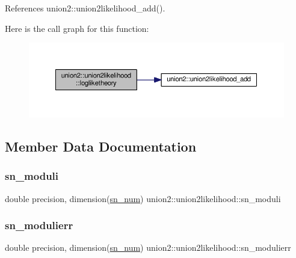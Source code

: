 References union2\+::union2likelihood\+\_\+add().

Here is the call graph for this function\+:
\nopagebreak
\begin{figure}[H]
\begin{center}
\leavevmode
\includegraphics[width=350pt]{structunion2_1_1union2likelihood_aa1eacea20f0e7bf3c7240826272ca6d4_cgraph}
\end{center}
\end{figure}


\subsection{Member Data Documentation}
\mbox{\label{structunion2_1_1union2likelihood_a55465c072a132baa6c43b7e459f2d7d8}} 
\subsubsection{\texorpdfstring{sn\+\_\+moduli}{sn\_moduli}}
{\footnotesize\ttfamily double precision, dimension(\mbox{\hyperlink{namespaceunion2_a263e630a36e6cdb0d23c6982c2d13b8e}{sn\+\_\+num}}) union2\+::union2likelihood\+::sn\+\_\+moduli\hspace{0.3cm}{\ttfamily [private]}}

\mbox{\label{structunion2_1_1union2likelihood_a74507d56416d98714f489fae825677dc}} 
\subsubsection{\texorpdfstring{sn\+\_\+modulierr}{sn\_modulierr}}
{\footnotesize\ttfamily double precision, dimension(\mbox{\hyperlink{namespaceunion2_a263e630a36e6cdb0d23c6982c2d13b8e}{sn\+\_\+num}}) union2\+::union2likelihood\+::sn\+\_\+modulierr\hspace{0.3cm}{\ttfamily [private]}}

